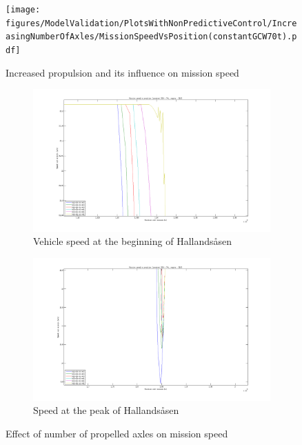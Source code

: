 \documentclass[ExampleMasters.tex]{subfiles}
\begin{document}
	\begin{figure}
	\centering
	\texttt{[image: figures/ModelValidation/PlotsWithNonPredictiveControl/IncreasingNumberOfAxles/MissionSpeedVsPosition(constantGCW70t).pdf]}
	\caption{Increased propulsion and its influence on mission speed}
	\label{globalMissionSpeedIncreasedPropulsion}
	\end{figure}
	\begin{figure}
	\begin{subfigure}{.5\textwidth}
	\centering
	\includegraphics[width=\linewidth]{figures/ModelValidation/PlotsWithNonPredictiveControl/IncreasingNumberOfAxles/SpeedVsPositionZoomedNoOfAxlesBeginDec.png}
	\caption{Vehicle speed at the beginning of Hallands\aa sen}
	\end{subfigure}
	\begin{subfigure}{.5\textwidth}
	\centering
	\includegraphics[width=\linewidth]{figures/ModelValidation/PlotsWithNonPredictiveControl/IncreasingNumberOfAxles/SpeedVsPositionZoomedNoOfAxlesPeak.png}
	\caption{Speed at the peak of Hallands\aa sen}
	\end{subfigure}
	\caption{Effect of number of propelled axles on mission speed}
	\label{missionSpeedIncreasedPropulsion}
	\end{figure}
\end{document}
